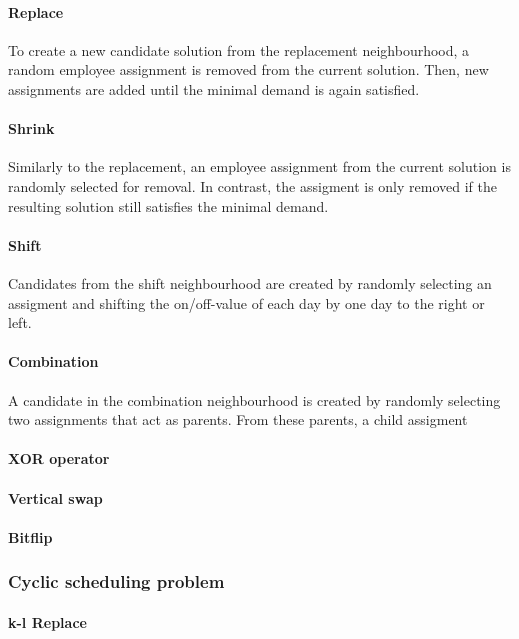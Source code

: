 \documentclass[]{article}
\begin{document}
\paragraph{Replace}

To create a new candidate solution from the replacement neighbourhood, a random employee assignment is removed from the current solution. Then, new assignments are added until the minimal demand is again satisfied.

\paragraph{Shrink}

Similarly to the replacement, an employee assignment from the current solution is randomly selected for removal. In contrast, the assigment is only removed if the resulting solution still satisfies the minimal demand.

\paragraph{Shift}

Candidates from the shift neighbourhood are created by randomly selecting an assigment and shifting the on/off-value of each day by one day to the right or left.

\paragraph{Combination}

A candidate in the combination neighbourhood is created by randomly selecting two assignments that act as parents. From these parents, a child assigment 

\paragraph{XOR operator}
\paragraph{Vertical swap}
\paragraph{Bitflip}
\subsubsection{Cyclic scheduling problem}
\paragraph{k-l Replace}
\end{document}
